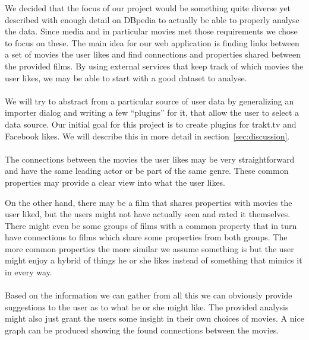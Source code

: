 We decided that the focus of our project would be something quite diverse yet described with enough detail on DBpedia to actually be able to properly analyse the data. Since media and in particular movies met those requirements we chose to focus on these. The main idea for our web application is finding links between a set of movies the user likes and find connections and properties shared between the provided films. By using external services that keep track of which movies the user likes, we may be able to start with a good dataset to analyse.

\paragraph{}
We will try to abstract from a particular source of user data by generalizing
an importer dialog and writing a few ``plugins'' for it, that allow the user
to select a data source.
Our initial goal for this project is to create plugins for trakt.tv and
Facebook likes.
We will describe this in more detail in section~\ref{sec:discussion}.

\paragraph{}
The connections between the movies the user likes may be very straightforward and have the same leading actor or be part of the same genre. These common properties may provide a clear view into what the user likes.

On the other hand, there may be a film that shares properties with movies the user liked, but the users might not have actually seen and rated it themselves. There might even be some groups of films with a common property that in turn have connections to films which share some properties from both groups. The more common properties the more similar we assume something is but the user might enjoy a hybrid of things he or she likes instead of something that mimics it in every way.

\paragraph{}
Based on the information we can gather from all this we can obviously provide suggestions to the user as to what he or she might like. The provided analysis might also just grant the users some insight in their own choices of movies. A nice graph can be produced showing the found connections between the movies.

